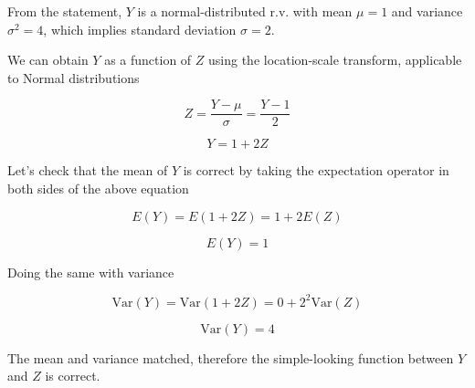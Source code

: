 From the statement, $Y$ is a normal-distributed r.v. with mean $\mu=1$ and variance $\sigma^2=4$, which implies standard deviation $\sigma=2$.


We can obtain $Y$ as a function of $Z$ using the location-scale transform, applicable to Normal distributions

$$
Z = \frac{Y-\mu}{\sigma} = \frac{Y-1}{2}
$$

$$
Y = 1 + 2 Z
$$


Let's check that the mean of $Y$ is correct by taking the expectation operator in both sides of the above equation

$$
E(Y) = E(1 + 2Z) = 1 + 2 E(Z)
$$

$$
E(Y) = 1
$$

Doing the same with variance

$$
\mathrm{Var}(Y) = \mathrm{Var}(1 + 2Z) = 0 + 2^2 \mathrm{Var}(Z)
$$

$$
\mathrm{Var}(Y) = 4
$$

The mean and variance matched, therefore the simple-looking function between $Y$ and $Z$ is correct.
